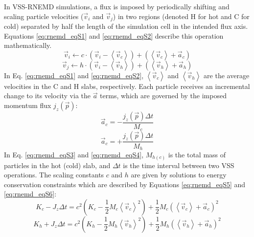 In VSS-RNEMD simulations, a flux is imposed by periodically shifting and scaling particle velocities ($\vec{v}_i$ and $\vec{v}_j$) in two regions (denoted H for hot and C for cold) separated by half the length of the simulation cell in the intended flux axis.  Equations \ref{eq:rnemd_eqS1} and \ref{eq:rnemd_eqS2} describe this operation mathematically.
\begin{equation} \label{eq:rnemd_eqS1}
\vec{v}_i \leftarrow  c \cdot \left(\vec{v}_i - \left\langle\vec{v}_c\right\rangle\right) + \left(\left\langle\vec{v}_c\right\rangle + \vec{a}_c\right)
\end{equation}
\begin{equation} \label{eq:rnemd_eqS2}
\vec{v}_j \leftarrow  h \cdot \left(\vec{v}_i - \left\langle\vec{v}_h\right\rangle\right) + \left(\left\langle\vec{v}_h\right\rangle + \vec{a}_h\right)
\end{equation}
In Eq. \ref{eq:rnemd_eqS1} and \ref{eq:rnemd_eqS2}, $\left\langle\vec{v}_c\right\rangle$ and $\left\langle\vec{v}_h\right\rangle$ are the average velocities in the C and H slabs, respectively.  Each particle receives an incremental change to its velocity via the $\vec{a}$ terms, which are governed by the imposed momentum flux $j_z(\vec{p})$:
\begin{equation} \label{eq:rnemd_eqS3}
\vec{a}_c = -\frac{j_z\left(\vec{p}\right)\Delta t}{M_c}
\end{equation}
\begin{equation} \label{eq:rnemd_eqS4}
\vec{a}_c = +\frac{j_z\left(\vec{p}\right)\Delta t}{M_h}
\end{equation}
In Eq. \ref{eq:rnemd_eqS3} and \ref{eq:rnemd_eqS4}, $M_{h\left(c\right)}$ is the total mass of particles in the hot (cold) slab, and $\Delta t$ is the time interval between two VSS operations.  The scaling constants $c$ and $h$ are given by solutions to energy conservation constraints which are described by Equations \ref{eq:rnemd_eqS5} and \ref{eq:rnemd_eqS6}: 
\begin{equation} \label{eq:rnemd_eqS5}
K_c - J_z\Delta t = c^2\left(K_c -\frac{1}{2}M_c\left\langle\vec{v}_c\right\rangle^2\right) + \frac{1}{2}M_c\left(\left\langle\vec{v}_c\right\rangle + \vec{a}_c\right)^2
\end{equation}
\begin{equation} \label{eq:rnemd_eqS6}
K_h + J_z\Delta t = c^2\left(K_h -\frac{1}{2}M_h\left\langle\vec{v}_h\right\rangle^2\right) + \frac{1}{2}M_h\left(\left\langle\vec{v}_h\right\rangle + \vec{a}_h\right)^2
\end{equation}
